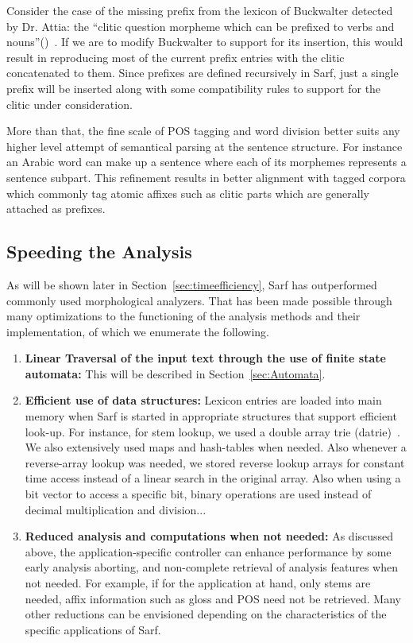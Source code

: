 \documentclass[a4,12pt]{report}
\begin{document}
Consider the case of the missing prefix from the lexicon of Buckwalter detected by Dr. Attia: the 
``clitic question morpheme which can be prefixed to verbs and nouns''()~\cite{Attia:06b}.
If we are to modify Buckwalter to support for its insertion, this would result in reproducing most of the current
prefix entries with the clitic concatenated to them. Since prefixes are defined recursively in Sarf, just a single 
prefix will be inserted along with some compatibility rules to support for the clitic under consideration.

More than that, the fine scale of POS tagging and word division better suits any higher level attempt of semantical
parsing at the sentence structure. For instance an Arabic word can make up a sentence where each of its morphemes 
represents a sentence subpart. This refinement results in better alignment with tagged corpora which commonly tag atomic affixes such as clitic 
parts which are generally attached as prefixes. 

\subsection{Speeding the Analysis} %

As will be shown later in Section~\ref{sec:timeefficiency}, Sarf has outperformed commonly used
morphological analyzers. That has been made possible through many optimizations to the functioning
of the analysis methods and their implementation, of which we enumerate the following.

\begin{enumerate}
\item \textbf{Linear Traversal of the input text through the use of finite state automata:}
	This will be described in Section~\ref{sec:Automata}.
\item \textbf{Efficient use of data structures:} Lexicon entries are loaded into main memory 
	when Sarf is started in appropriate structures that support efficient look-up. For instance,
	for stem lookup, we used a double array trie (datrie)~\cite{Aoe:89}. We also extensively used
	maps and hash-tables when needed. Also whenever a reverse-array lookup was needed, we stored
	reverse lookup arrays for constant time access instead of a linear search in the original array.
	Also when using a bit vector to access a specific bit, binary operations are used instead of
	decimal multiplication and division...
\item \textbf{Reduced analysis and computations when not needed:} As discussed above, the 
	application-specific controller can enhance performance by some early analysis aborting, and
	non-complete retrieval of analysis features when not needed. For example, if for the application 
	at hand, only stems are needed, affix information such as gloss and POS need not be retrieved.
	Many other reductions can be envisioned depending on the characteristics of the
	specific applications of Sarf. 
\end{enumerate}
\end{document}
